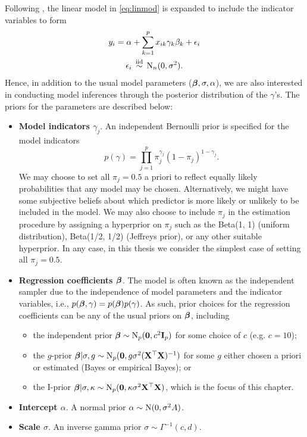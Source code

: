 \documentclass[11pt,twoside,openright]{report}
\begin{document}
Following \citet{Kuo1998}, the linear model in \cref{eq:linmod} is expanded to include the indicator variables to form
\begin{align}\label{eq:km}
  \begin{gathered}
    y_i = \alpha + \sum_{k=1}^p x_{ik}\gamma_k\beta_k + \epsilon_i \\
    \epsilon_i \,\overset{\text{iid}}{\sim}\, \operatorname{N}_n(0, \sigma^2).
  \end{gathered}  
\end{align} 
Hence, in addition to the usual model parameters (${\bm\beta},\sigma,\alpha$), we are also interested in conducting model inferences through the posterior distribution of the $\gamma$'s.
The priors for the parameters are described below:

\begin{itemize}
  \item \textbf{Model indicators $\gamma_j$}. An independent Bernoulli prior is specified for the model indicators 
  \begin{equation}\label{eq:priorgamma}
    p(\gamma) = \prod_{j=1}^p \pi_j^{\gamma_j}(1-\pi_j)^{1-\gamma_j}.
  \end{equation}
  We may choose to set all $\pi_j = 0.5$ a priori to reflect equally likely probabilities that any model may be chosen.
  Alternatively, we might have some subjective beliefs about which predictor is more likely or unlikely to be included in the model.
  We may also choose to include $\pi_j$ in the estimation procedure by assigning a hyperprior on $\pi_j$ such as the Beta(1, 1) (uniform distribution), Beta(1/2, 1/2) (Jeffreys prior), or any other suitable hyperprior.
  In any case, in this thesis we consider the simplest case of setting all $\pi_j = 0.5$.
  
  \item \textbf{Regression coefficients ${\bm\beta}$}. The \citet{Kuo1998} model is often known as the independent sampler due to the independence of model parameters and the indicator variables, i.e., $p({\bm\beta},\gamma) = p({\bm\beta})p(\gamma)$.
  As such, prior choices for the regression coefficients can be any of the usual priors on ${\bm\beta}$, including 
  \begin{itemize}
    \item the independent prior ${\bm\beta}\sim\operatorname{N}_p({\mathbf 0},c^2{\mathbf I}_p)$ for some choice of $c$ (e.g. $c=10$);
    \item the $g$-prior ${\bm\beta}|\sigma,g \sim\operatorname{N}_p({\mathbf 0},g\sigma^2(\mathbf X^\top \mathbf X)^{-1})$ for some $g$ either chosen a priori or estimated (Bayes or empirical Bayes); or 
    \item the I-prior ${\bm\beta}|\sigma,\kappa \sim \operatorname{N}_p({\mathbf 0},\kappa\sigma^2\mathbf X^\top \mathbf X)$, which is the focus of this chapter.
  \end{itemize}
  
  \item \textbf{Intercept $\alpha$}. A normal prior $\alpha\sim\operatorname{N}(0,\sigma^2A)$.
  
  \item \textbf{Scale $\sigma$}. An inverse gamma prior $\sigma\sim\Gamma^{-1}(c,d)$.
\end{itemize}
\end{document}
